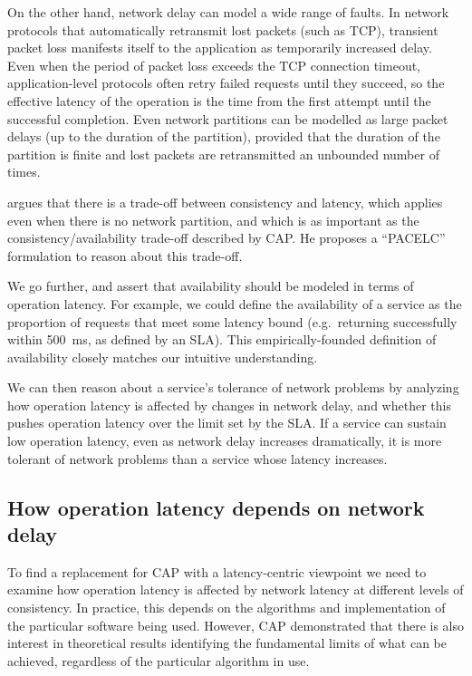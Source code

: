 \documentclass[fleqn,12pt,lineno]{wlpeerj} %
\begin{document}
On the other hand, network delay can model a wide range of faults. In network protocols that
automatically retransmit lost packets (such as TCP), transient packet loss manifests itself to the
application as temporarily increased delay. Even when the period of packet loss exceeds the TCP
connection timeout, application-level protocols often retry failed requests until they succeed, so
the effective latency of the operation is the time from the first attempt until the successful
completion. Even network partitions can be modelled as large packet delays (up to the duration of
the partition), provided that the duration of the partition is finite and lost packets are
retransmitted an unbounded number of times.

\citet{Abadi2012hb} argues that there is a trade-off between consistency and latency, which
applies even when there is no network partition, and which is as important as the
consistency/availability trade-off described by CAP. He proposes a ``PACELC'' formulation to reason
about this trade-off.

We go further, and assert that availability should be modeled in terms of operation latency. For
example, we could define the availability of a service as the proportion of requests that meet some
latency bound (e.g.\ returning successfully within 500~ms, as defined by an SLA). This
empirically-founded definition of availability closely matches our intuitive understanding.

We can then reason about a service's tolerance of network problems by analyzing how operation
latency is affected by changes in network delay, and whether this pushes operation latency over the
limit set by the SLA. If a service can sustain low operation latency, even as network delay
increases dramatically, it is more tolerant of network problems than a service whose latency
increases.

\subsection{How operation latency depends on network delay}\label{sec:network-dependence}

To find a replacement for CAP with a latency-centric viewpoint we need to examine how operation
latency is affected by network latency at different levels of consistency. In practice, this depends
on the algorithms and implementation of the particular software being used. However, CAP
demonstrated that there is also interest in theoretical results identifying the fundamental limits
of what can be achieved, regardless of the particular algorithm in use.
\end{document}
